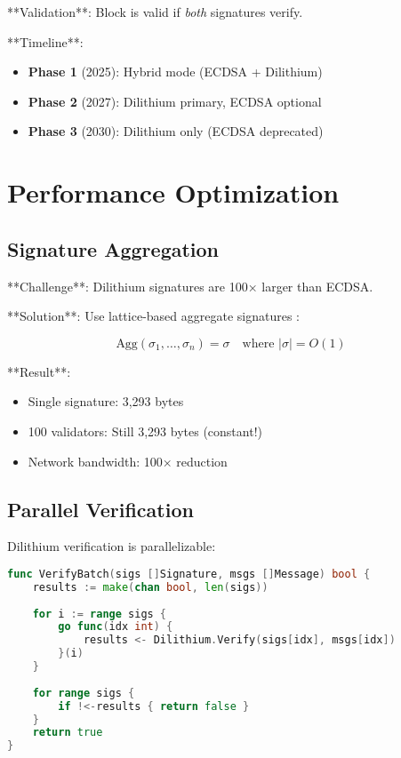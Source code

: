 \documentclass[11pt,letterpaper]{article}
\begin{document}
**Validation**: Block is valid if \emph{both} signatures verify.

**Timeline**:
\begin{itemize}
    \item \textbf{Phase 1} (2025): Hybrid mode (ECDSA + Dilithium)
    \item \textbf{Phase 2} (2027): Dilithium primary, ECDSA optional
    \item \textbf{Phase 3} (2030): Dilithium only (ECDSA deprecated)
\end{itemize}

\section{Performance Optimization}

\subsection{Signature Aggregation}

**Challenge**: Dilithium signatures are 100× larger than ECDSA.

**Solution**: Use lattice-based aggregate signatures \cite{boneh2003aggregate}:

\begin{equation}
\text{Agg}(\sigma_1, \ldots, \sigma_n) = \sigma \quad \text{where } |\sigma| = O(1)
\end{equation}

**Result**: 
\begin{itemize}
    \item Single signature: 3,293 bytes
    \item 100 validators: Still 3,293 bytes (constant!)
    \item Network bandwidth: 100× reduction
\end{itemize}

\subsection{Parallel Verification}

Dilithium verification is parallelizable:

\begin{lstlisting}[language=Go]
func VerifyBatch(sigs []Signature, msgs []Message) bool {
    results := make(chan bool, len(sigs))
    
    for i := range sigs {
        go func(idx int) {
            results <- Dilithium.Verify(sigs[idx], msgs[idx])
        }(i)
    }
    
    for range sigs {
        if !<-results { return false }
    }
    return true
}
\end{lstlisting}
\end{document}
